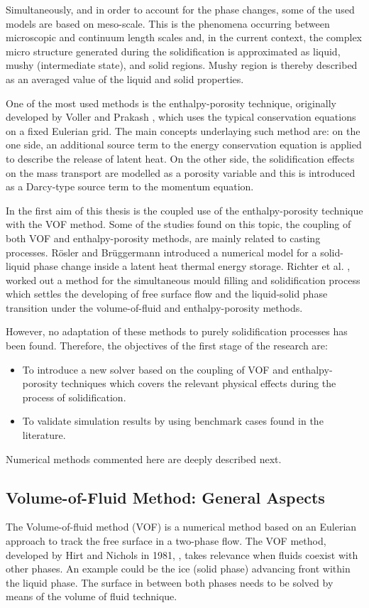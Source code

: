 \noindent Simultaneously, and in order to account for the phase changes, some of the used models are based on meso-scale. This is the phenomena occurring between microscopic and continuum length scales and, in the current context, the complex micro structure generated during the solidification is approximated as liquid, mushy (intermediate state), and solid regions. Mushy region is thereby described as an averaged value of the liquid and solid properties.

\noindent One of the most used methods is the enthalpy-porosity technique, originally developed by Voller and Prakash \cite{voller_prakash_1987}, which uses the typical conservation equations on a fixed Eulerian grid. The main concepts underlaying such method are: on the one side, an additional source term to the energy conservation equation is applied to describe the release of latent heat. On the other side, the solidification effects on the mass transport are modelled as a porosity variable and this is introduced as a Darcy-type source term to the momentum equation.


\noindent In the first aim of this thesis is the coupled use of the enthalpy-porosity technique with the VOF method. Some of the studies found on this topic, the coupling of both VOF and enthalpy-porosity methods, are mainly related to casting processes. Rösler and Brüggermann \cite{rösler_brüggemann_2011} introduced a numerical model for a solid-liquid phase change inside a latent heat thermal energy storage. Richter et al. \cite{richter_turnow_kornev_hassel_2016}, worked out a method for the simultaneous mould filling and solidification process which settles the developing of free surface flow and the liquid-solid phase transition under the volume-of-fluid and enthalpy-porosity methods.

\noindent However, no adaptation of these methods to purely solidification processes has been found. Therefore, the objectives of the first stage of the research are:
\begin{itemize}
	\item To introduce a new solver based on the coupling of VOF and enthalpy-porosity techniques which covers the relevant physical effects during the process of solidification.
	\item	To validate simulation results by using benchmark cases found in the literature.
\end{itemize}
Numerical methods commented here are deeply described next.

\subsection{Volume-of-Fluid Method: General Aspects}
\setlength{\parindent}{0.5cm} The Volume-of-fluid method (VOF) is a numerical method based on an Eulerian approach to track the free surface in a two-phase flow.
The VOF method, developed by Hirt and Nichols in 1981, \cite{hirt_nichols_1981}, takes relevance when fluids coexist with other phases. An example could be the ice (solid phase) advancing front within the liquid phase. The surface in between both phases needs to be solved by means of the volume of fluid technique.

